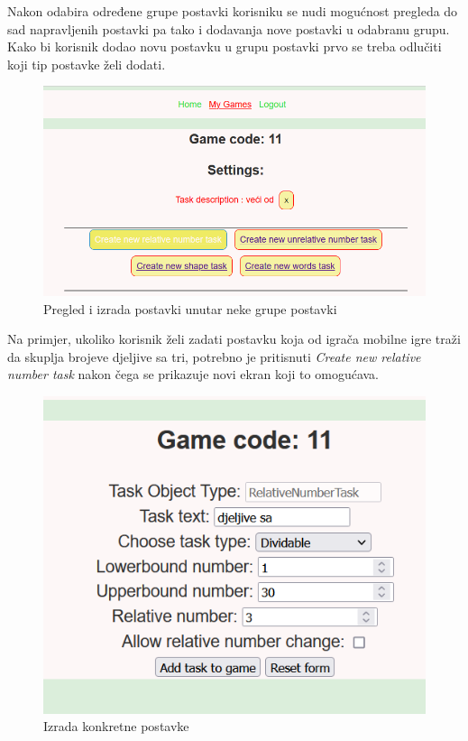 \documentclass[times, utf8, zavrsni]{fer}
\begin{document}
	 Nakon odabira određene grupe postavki korisniku se nudi mogućnost pregleda do sad napravljenih postavki pa tako i dodavanja nove postavki u odabranu grupu. Kako bi korisnik dodao novu postavku u grupu postavki prvo se treba odlučiti koji 
	 tip postavke želi dodati. 
	 	\begin{figure}[H]
			\includegraphics[scale = 0.7]{"slike/zadavanjepostavki.png"} 
			\centering
			\caption{Pregled i izrada postavki unutar neke grupe postavki}
			\label{fig:pregledpostavki}
		\end{figure}
	Na primjer, ukoliko korisnik želi zadati postavku koja od igrača mobilne igre traži da skuplja brojeve djeljive sa tri, potrebno je pritisnuti \textit{Create new relative number task} nakon čega se prikazuje novi ekran koji to omogućava.
	\begin{figure}[H]
		\includegraphics[scale = 0.9]{"slike/zadavanjekonkretnepostavke.png"} 
		\centering
		\caption{Izrada konkretne postavke}
		\label{fig:izradapostavkedjeljenje}
	\end{figure}
		
\end{document}
